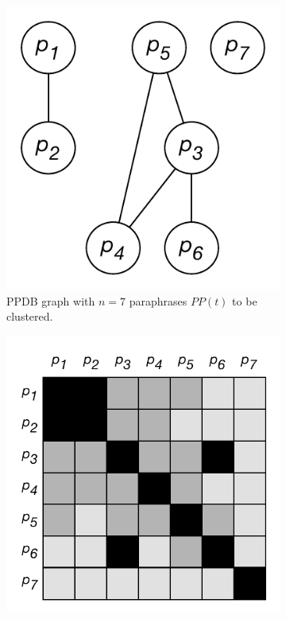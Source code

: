 \documentclass[11pt]{article}
\begin{document}
\begin{figure}
	\begin{subfigure}[t]{0.25\textwidth}
		\includegraphics[width=\textwidth]{images/pp_graph.pdf}
		\caption{PPDB graph with $n=7$ paraphrases $PP(t)$ to be clustered.}
		\label{fig:ppgraph}
	\end{subfigure}
	\hfill%
	\begin{subfigure}[t]{0.36\textwidth}
		\includegraphics[width=\textwidth]{images/pp_mat_all.pdf}

\end{subfigure}
\end{figure}
\end{document}
